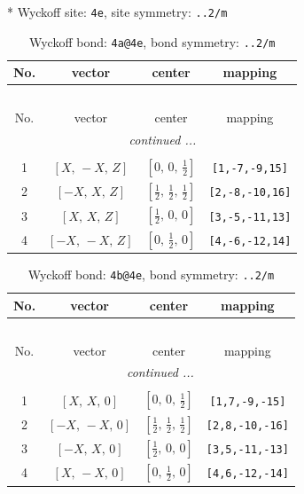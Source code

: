 \documentclass[fleqn,8pt]{jsarticle}
\begin{document}
* Wyckoff site: {\tt 4e}, site symmetry: {\tt ..2/m}
\renewcommand{\arraystretch}{1.2}
\begin{longtable}{cccc}
\caption{Wyckoff bond: {\tt 4a@4e}, bond symmetry: {\tt ..2/m}}
 \\
 \hline \hline
No. & vector & center & mapping \\ \hline \endfirsthead

\multicolumn{3}{l}{\tablename\ \thetable{}} \\
 \hline \hline
No. & vector & center & mapping \\ \hline \endhead

 \hline \hline
\multicolumn{3}{r}{\footnotesize\it continued ...} \\ \endfoot

 \hline \hline
\multicolumn{3}{r}{} \\ \endlastfoot

1 & $\left[ X,\, - X,\, Z \right]$ & $\left[ 0,\, 0,\, \frac{1}{2} \right]$ & {\tt [1,-7,-9,15]} \\ \hline
2 & $\left[ - X,\, X,\, Z \right]$ & $\left[ \frac{1}{2},\, \frac{1}{2},\, \frac{1}{2} \right]$ & {\tt [2,-8,-10,16]} \\ \hline
3 & $\left[ X,\, X,\, Z \right]$ & $\left[ \frac{1}{2},\, 0,\, 0 \right]$ & {\tt [3,-5,-11,13]} \\ \hline
4 & $\left[ - X,\, - X,\, Z \right]$ & $\left[ 0,\, \frac{1}{2},\, 0 \right]$ & {\tt [4,-6,-12,14]} \\
\end{longtable}
\renewcommand{\arraystretch}{1.2}
\begin{longtable}{cccc}
\caption{Wyckoff bond: {\tt 4b@4e}, bond symmetry: {\tt ..2/m}}
 \\
 \hline \hline
No. & vector & center & mapping \\ \hline \endfirsthead

\multicolumn{3}{l}{\tablename\ \thetable{}} \\
 \hline \hline
No. & vector & center & mapping \\ \hline \endhead

 \hline \hline
\multicolumn{3}{r}{\footnotesize\it continued ...} \\ \endfoot

 \hline \hline
\multicolumn{3}{r}{} \\ \endlastfoot

1 & $\left[ X,\, X,\, 0 \right]$ & $\left[ 0,\, 0,\, \frac{1}{2} \right]$ & {\tt [1,7,-9,-15]} \\ \hline
2 & $\left[ - X,\, - X,\, 0 \right]$ & $\left[ \frac{1}{2},\, \frac{1}{2},\, \frac{1}{2} \right]$ & {\tt [2,8,-10,-16]} \\ \hline
3 & $\left[ - X,\, X,\, 0 \right]$ & $\left[ \frac{1}{2},\, 0,\, 0 \right]$ & {\tt [3,5,-11,-13]} \\ \hline
4 & $\left[ X,\, - X,\, 0 \right]$ & $\left[ 0,\, \frac{1}{2},\, 0 \right]$ & {\tt [4,6,-12,-14]} \\
\end{longtable}
\end{document}
